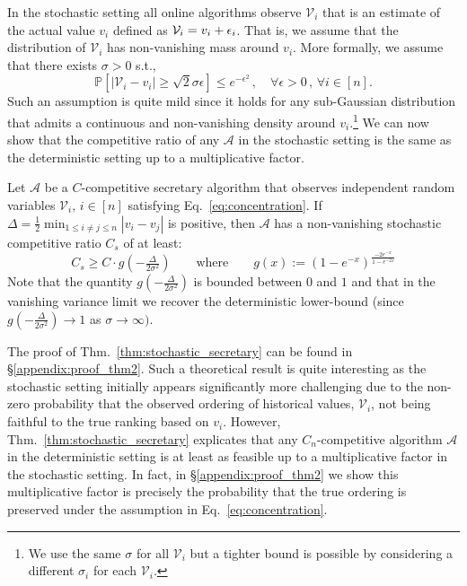 In the stochastic setting all online algorithms observe $\mathcal{V}_i$ that is an estimate of the actual value $v_i$ defined as $\mathcal{V}_i = v_i + {\epsilon}_i$. That is, we assume that the distribution of $\mathcal{V}_{i}$ has non-vanishing mass around $v_i$. More formally, we assume that there exists $\sigma>0$ s.t., 
    \begin{equation}
        \mathbb{P}[|\mathcal{V}_{i}-v_i| \geq \sqrt{2}\sigma \epsilon] \leq e^{-\epsilon^2} \,,\quad \forall \epsilon >0\,,\,\forall i \in [n].
        \label{eq:concentration}
    \end{equation}
Such an assumption is quite mild since it holds for any sub-Gaussian distribution that admits a continuous and non-vanishing density around $v_i$.\footnote{We use the same $\sigma$ for all $\mathcal{V}_{i}$ but a tighter bound is possible by considering a different $\sigma_i$ for each $\mathcal{V}_{i}$.}
We can now show that the competitive ratio of any $\mathcal{A}$ in the stochastic setting is the same as the deterministic setting up to a multiplicative factor.
\begin{theorem}\label{thm:stochastic_secretary}
Let $\mathcal{A}$ be a $C$-competitive secretary algorithm that observes independent random variables $\mathcal{V}_{i},\, i\in [n]$ satisfying Eq.~\ref{eq:concentration}. If $\Delta = \tfrac{1}{2}\min_{1\leq i \neq j \leq  n } |v_i - v_j|$ is positive, then $\mathcal{A}$ has a non-vanishing stochastic competitive ratio $C_{s}$ of at least:  
\begin{equation}
   C_{s} \geq  C \cdot g( -\tfrac{\Delta}{2\sigma^2})  \qquad  \text{where} \qquad g(x) := \left( 1-e^{- x} \right)^{\frac{-2 e^{-x}}{1 -  e^{-2x}}}
\end{equation}
Note that the quantity $g\left( -\tfrac{\Delta}{2\sigma^2}\right)$ is bounded between $0$ and $1$ and that in the vanishing variance limit we recover the deterministic lower-bound (since $g( -\tfrac{\Delta}{2\sigma^2}) {\to} 1$ as $\sigma \to \infty)$.
\end{theorem}

The proof of Thm.~\ref{thm:stochastic_secretary} can be found in \S\ref{appendix:proof_thm2}. Such a theoretical result is quite interesting as the stochastic setting initially appears significantly more challenging due to the non-zero probability that the observed ordering of historical values, $\mathcal{V}_i$, not being faithful to the true ranking based on $v_i$. However, Thm.~\ref{thm:stochastic_secretary} explicates that any $C_n$-competitive algorithm $\mathcal{A}$ in the deterministic setting is at least as feasible up to a multiplicative factor in the stochastic setting. In fact, in \S\ref{appendix:proof_thm2} we show this multiplicative factor is precisely the probability that the true ordering  is preserved under the assumption in Eq.~\ref{eq:concentration}.



